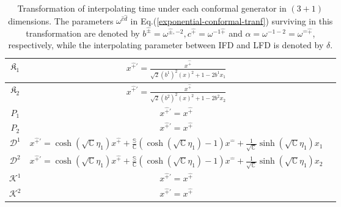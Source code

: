 \documentclass[%
 reprint,
superscriptaddress,
 amsmath,amssymb,
 aps,
]{revtex4-2}
\begin{document}
\begin{widetext}
\begin{center}
\begin{table}[h!]
{\begin{tabular}{|c||c|c|}
             \rule{0pt}{16pt} $\mathfrak{K}_{1}$ & $x^{\hat{+}\prime}=\frac{x^{{\hat{+}}}}{ \sqrt{2}(b^{1})^{2}(x)^2+1-2b^{1}x_{1}}$ \\
             \hline
             \rule{0pt}{16pt} $\mathfrak{K}_{2}$ &  $x^{\hat{+}\prime}=\frac{x^{{\hat{+}}}}{ \sqrt{2}(b^{2})^{2}(x)^2+1-2b^{2}x_{2}}$ \\
             \hline
              \rule{0pt}{16pt} $P_{1}$ & $ x^{\hat{+}\prime}=x^{\hat{+}}$  \\
              \hline
              \rule{0pt}{16pt} $P_{2}$ & $ x^{\hat{+}\prime}=x^{\hat{+}}$  \\
              \hline
               \rule{0pt}{16pt} $\mathcal{D}^{1}$ &  $ x^{\hat{+}\prime}=\cosh{(\sqrt{\mathbb{C}}\eta_{1})}x^{\hat{+}}+\frac{\mathbb{S}}{\mathbb{C}}\left(\cosh{(\sqrt{\mathbb{C}}\eta_{1})}-1\right)x^{\hat{-}}+\frac{1}{\sqrt{\mathbb{C}}}\sinh{(\sqrt{\mathbb{C}}\eta_{1})}x_{{1}}$ \\
               \hline
               \rule{0pt}{16pt} $\mathcal{D}^{2}$ & $ x^{\hat{+}\prime}=\cosh{(\sqrt{\mathbb{C}}\eta_{1})}x^{\hat{+}}+\frac{\mathbb{S}}{\mathbb{C}}\left(\cosh{(\sqrt{\mathbb{C}}\eta_{1})}-1\right)x^{\hat{-}}+\frac{1}{\sqrt{\mathbb{C}}}\sinh{(\sqrt{\mathbb{C}}\eta_{1})}x_{{2}}$ \\
               \hline
               \rule{0pt}{16pt} $\mathcal{K}^{1}$ & $ x^{\hat{+}\prime}=x^{\hat{+}}$ \\
               \hline
               \rule{0pt}{16pt} $\mathcal{K}^{2}$ & $ x^{\hat{+}\prime}=x^{\hat{+}}$ \\
               \hline
        \end{tabular}}
        \caption{Transformation of interpolating time under each conformal generator in $(3+1)$ dimensions. The parameters $\omega^{\hat{c}\hat{d}}$ in Eq.(\ref{exponential-conformal-tranf}) surviving in this transformation are denoted by  
$b^{\hat{\pm}}=\omega^{\hat{\pm},-2},c^{\hat{+}}=\omega^{-1\hat{+}}$ and $\alpha=\omega^{-1-2}=\omega^{\hat{-}\hat{+}}$, respectively, while the interpolating parameter between IFD and LFD is denoted by $\delta$.}
        \label{tablexprime}
    \end{table}
    \end{center}



\end{widetext}
\end{document}
